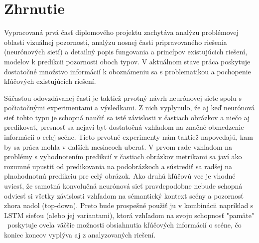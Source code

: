 \newpage

\section{Zhrnutie}

Vypracovaná prvá časť diplomového projektu zachytáva analýzu problémovej oblasti vizuálnej pozornosti, analýzu nosnej časti pripravovaného riešenia (neurónových sietí) a detailný popis fungovania a princípov existujúcich riešení, modelov k predikcii pozornosti oboch typov. V aktuálnom stave práca poskytuje dostatočné množstvo informácií k oboznámeniu sa s problematikou a pochopenie kľúčových existujúcich riešení. 

Súčasťou odovzdávanej časti je taktiež prvotný návrh neurónovej siete spolu s počiatočnými experimentami a výsledkami. Z nich vyplynulo, že aj keď neurónová sieť tohto typu je schopná naučiť sa isté závislosti v častiach obrázkov a niečo aj predikovať, presnosť sa nejaví byť dostatočná vzhľadom na značné obmedzenie informácií o celej scéne. Tieto prvotné experimenty nám taktiež napovedajú, kam by sa práca mohla v ďalších mesiacoch uberať. V prvom rade vzhľadom na problémy s vyhodnotením predikcií v častiach obrázkov metrikami sa javí ako rozumné upustiť od predikovania na podobrázkoch a sústrediť sa radšej na plnohodnotnú predikciu pre celý obrázok. Ako druhú kľúčovú vec je vhodné uviesť, že samotná konvolučná neurónová sieť pravdepodobne nebude schopná odviesť si všetky závislosti vzhľadom na sémantický kontext scény a pozornosť zhora nadol (top-down). Preto bude prospešné použiť ju v kombinácii napríklad s LSTM sieťou (alebo jej variantami), ktorá vzhľadom na svoju schopnosť "pamäte" \ poskytuje oveľa väčšie možnosti obsiahnutia kľúčových informácií o scéne, čo koniec koncov vyplýva aj z analyzovaných riešení.